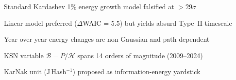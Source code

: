 \begin{highlights}
\item Standard Kardashev 1\% energy growth model falsified at $>29\sigma$
\item Linear model preferred ($\Delta$WAIC = 5.5) but yields absurd Type~II timescale
\item Year-over-year energy changes are non-Gaussian and path-dependent
\item KSN variable $\mathscr{B}=P/\mathcal{H}$ spans 14 orders of magnitude (2009--2024)
\item KarNak unit (J\,Hash$^{-1}$) proposed as information-energy yardstick
\end{highlights}